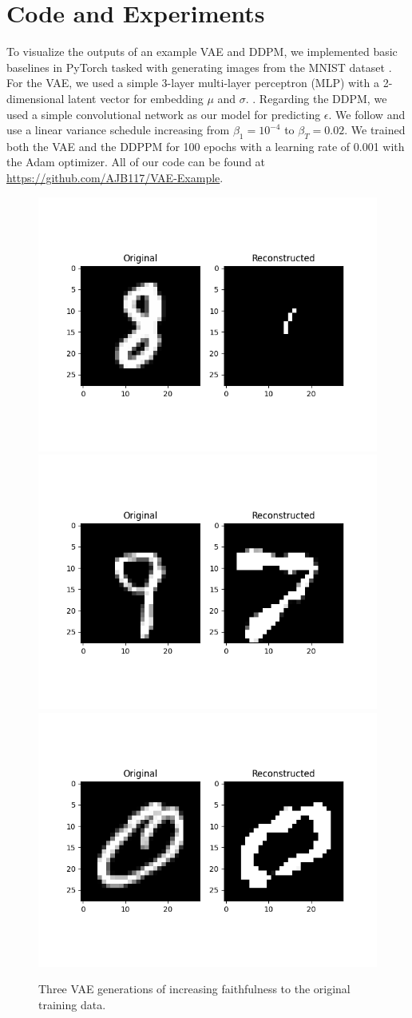 \documentclass{article}
\begin{document}
\section{Code and Experiments}
To visualize the outputs of an example VAE and DDPM, we implemented basic baselines in PyTorch \citep{DBLP:journals/corr/abs-1912-01703} tasked with generating images from the MNIST dataset \citep{lecun-mnisthandwrittendigit-2010}. For the VAE, we used a simple 3-layer multi-layer perceptron (MLP) with a 2-dimensional latent vector for embedding $\mu$ and $\sigma$. \citep{KingBa15}. Regarding the DDPM, we used a simple convolutional network as our model for predicting $\epsilon$. We follow \cite{ho-denoising} and use a linear variance schedule increasing from $\beta_1 = 10^{-4}$ to $\beta_T = 0.02$. We trained both the VAE and the DDPPM for 100 epochs with a learning rate of 0.001 with the Adam optimizer. All of our code can be found at \url{https://github.com/AJB117/VAE-Example}.
\begin{figure}
    \centering
    \includegraphics[width=.3\textwidth]{vae_fail.png}
    \includegraphics[width=.3\textwidth]{vae_half_fail.png}
    \includegraphics[width=.3\textwidth]{vae_success.png}
    \caption{Three VAE generations of increasing faithfulness to the original training data.}
    \label{fig:vae-gen}
\end{figure}
\end{document}
